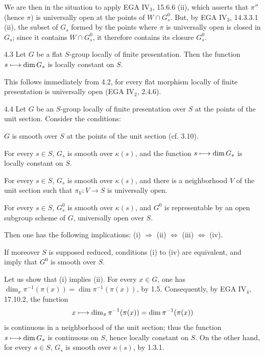 We are then in the situation to apply EGA IV$_3$, 15.6.6 (ii), which asserts that $\pi''$ (hence $\pi$) is universally open at the points of $W\cap G_s^0$. But, by EGA IV$_3$, 14.3.3.1 (ii), the subset of $G_s$ formed by the points where $\pi$ is universally open is closed in $G_s$; since it contains $W\cap G_s^0$, it therefore contains its closure $G_s^0$.
\begin{corollary}{4.3}\label{VIB.4.3}
Let $G$ be a flat $S$-group locally of finite presentation. Then the function $s\longmapsto\dim G_s$ is locally constant on $S$.
\end{corollary}
This follows immediately from 4.2, for every flat morphism locally of finite presentation is universally open (EGA IV$_2$, 2.4.6).
\begin{corollary}{4.4}\label{VIB.4.4}
Let $G$ be an $S$-group locally of finite presentation over $S$ at the points of the unit section. Consider the conditions:
\begin{enumeratei}
\item $G$ is smooth over $S$ at the points of the unit section (cf. 3.10).
\item For every $s\in S$, $G_s$ is smooth over $\kappa(s)$, and the function $s\longmapsto\dim G_s$ is locally constant on $S$.
\item For every $s\in S$, $G_s$ is smooth over $\kappa(s)$, and there is a neighborhood $V$ of the unit section such that $\pi_V:V\to S$ is universally open.
\item For every $s\in S$, $G_s^0$ is smooth over $\kappa(s)$, and $G^0$ is representable by an open subgroup scheme of $G$, universally open over $S$.
\end{enumeratei}
Then one has the following implications: (i) $\Rightarrow$ (ii) $\Leftrightarrow$ (iii) $\Leftrightarrow$ (iv).

If moreover $S$ is supposed reduced, conditions (i) to (iv) are equivalent, and imply that $G^0$ is smooth over $S$.
\end{corollary}
Let us show that (i) implies (ii). For every $x\in G$, one has $\dim_x\pi^{-1}(\pi(x))=\dim\pi^{-1}(\pi(x))$, by 1.5. Consequently, by EGA IV$_4$, 17.10.2, the function
\[
x\longmapsto\dim_x\pi^{-1}(\pi(x))=\dim\pi^{-1}(\pi(x))
\]
is continuous in a neighborhood of the unit section; thus the function $s\longmapsto\dim G_s$ is continuous on $S$, hence locally constant on $S$. On the other hand, for every $s\in S$, $G_s$ is smooth over $\kappa(s)$, by 1.3.1.

